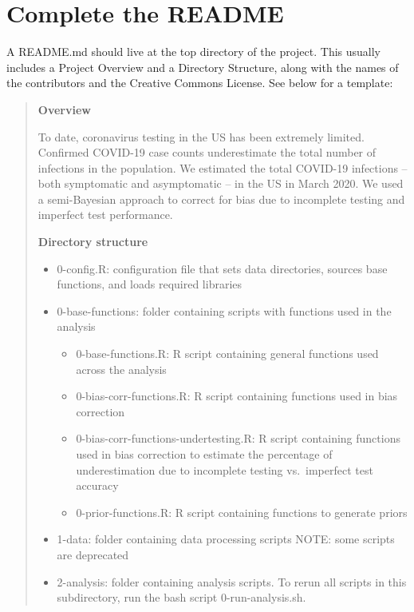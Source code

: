 \documentclass[
]{book}
\begin{document}
\section{Complete the README}\label{complete-the-readme}

A README.md should live at the top directory of the project. This usually includes a Project Overview and a Directory Structure, along with the names of the contributors and the Creative Commons License. See below for a template:

\begin{quote}
\textbf{Overview}

To date, coronavirus testing in the US has been extremely limited. Confirmed COVID-19 case counts underestimate the total number of infections in the population. We estimated the total COVID-19 infections -- both symptomatic and asymptomatic -- in the US in March 2020. We used a semi-Bayesian approach to correct for bias due to incomplete testing and imperfect test performance.

\textbf{Directory structure}

\begin{itemize}
\item
  0-config.R: configuration file that sets data directories, sources base functions, and loads required libraries
\item
  0-base-functions: folder containing scripts with functions used in the analysis

  \begin{itemize}
  \item
    0-base-functions.R: R script containing general functions used across the analysis
  \item
    0-bias-corr-functions.R: R script containing functions used in bias correction
  \item
    0-bias-corr-functions-undertesting.R: R script containing functions used in bias correction to estimate the percentage of underestimation due to incomplete testing vs.~imperfect test accuracy
  \item
    0-prior-functions.R: R script containing functions to generate priors
  \end{itemize}
\item
  1-data: folder containing data processing scripts NOTE: some scripts are deprecated
\item
  2-analysis: folder containing analysis scripts. To rerun all scripts in this subdirectory, run the bash script 0-run-analysis.sh.


\end{itemize}
\end{quote}
\end{document}
